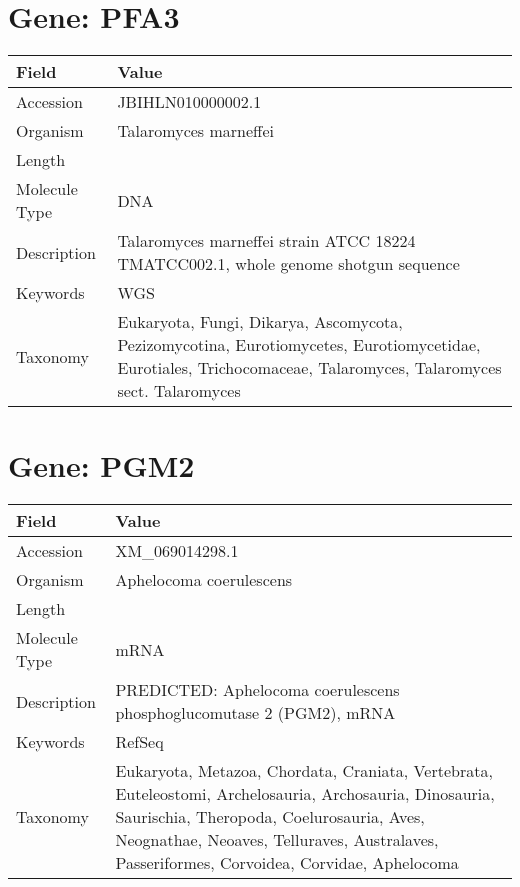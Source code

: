 \documentclass[10pt]{article}
\begin{document}
\section{Gene: PFA3}
{\footnotesize
\begin{longtable}{>{\raggedright\arraybackslash}p{4.5cm} >{\raggedright\arraybackslash}p{11.5cm}}
\textbf{Field} & \textbf{Value} \\
\hline
Accession & JBIHLN010000002.1 \\
Organism & Talaromyces marneffei \\
Length & 6416306 \\
Molecule Type & DNA \\
Description & Talaromyces marneffei strain ATCC 18224 TMATCC002.1, whole genome shotgun sequence \\
Keywords & WGS \\
Taxonomy & Eukaryota, Fungi, Dikarya, Ascomycota, Pezizomycotina, Eurotiomycetes, Eurotiomycetidae, Eurotiales, Trichocomaceae, Talaromyces, Talaromyces sect. Talaromyces \\
\end{longtable}
}

\vspace{1em}
\section{Gene: PGM2}
{\footnotesize
\begin{longtable}{>{\raggedright\arraybackslash}p{4.5cm} >{\raggedright\arraybackslash}p{11.5cm}}
\textbf{Field} & \textbf{Value} \\
\hline
Accession & XM\_069014298.1 \\
Organism & Aphelocoma coerulescens \\
Length & 4924 \\
Molecule Type & mRNA \\
Description & PREDICTED: Aphelocoma coerulescens phosphoglucomutase 2 (PGM2), mRNA \\
Keywords & RefSeq \\
Taxonomy & Eukaryota, Metazoa, Chordata, Craniata, Vertebrata, Euteleostomi, Archelosauria, Archosauria, Dinosauria, Saurischia, Theropoda, Coelurosauria, Aves, Neognathae, Neoaves, Telluraves, Australaves, Passeriformes, Corvoidea, Corvidae, Aphelocoma \\
\end{longtable}
}
\end{document}
